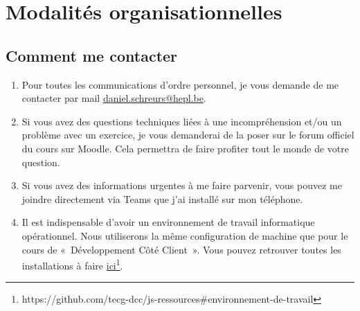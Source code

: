 \section{Modalités organisationnelles}
\subsection{Comment me contacter}
\begin{enumerate}
    \item Pour toutes les communications d'ordre personnel, je vous demande de me contacter par mail \href{mailto:daniel.schreurs@hepl.be}{daniel.schreurs@hepl.be}.
    \item Si vous avez des questions techniques liées à une incompréhension et/ou un problème avec un exercice, je vous demanderai de la poser sur le forum officiel du cours sur Moodle. Cela permettra de faire profiter tout le monde de votre question.
    \item Si vous avez des informations urgentes à me faire parvenir, vous pouvez me joindre directement via Teams que j'ai installé sur mon téléphone.
    \item Il est indispensable d'avoir un environnement de travail informatique opérationnel. Nous utiliserons la même configuration de machine que pour le cours de «~Développement Côté Client~». Vous pouvez retrouver toutes les installations à faire \href{https://github.com/tecg-dcc/js-ressources#environnement-de-travail}{ici}\footnote{https://github.com/tecg-dcc/js-ressources\#environnement-de-travail}.
\end{enumerate}


\clearpage
\printbibliography


